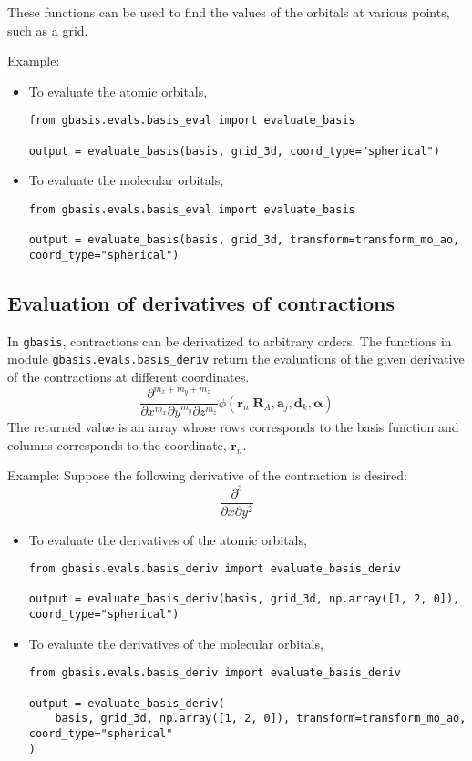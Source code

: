 \documentclass[letterpaper]{article}
\begin{document}
These functions can be used to find the values of the orbitals at various
points, such as a grid.

Example:
\begin{itemize}
\item To evaluate the atomic orbitals,
  \begin{lstlisting}[xleftmargin=-25pt]
from gbasis.evals.basis_eval import evaluate_basis

output = evaluate_basis(basis, grid_3d, coord_type="spherical")
\end{lstlisting}
\item To evaluate the molecular orbitals,
  \begin{lstlisting}[xleftmargin=-25pt]
from gbasis.evals.basis_eval import evaluate_basis

output = evaluate_basis(basis, grid_3d, transform=transform_mo_ao, coord_type="spherical")
\end{lstlisting}
\end{itemize}

\subsection{Evaluation of derivatives of contractions}
In \verb|gbasis|, contractions can be derivatized to arbitrary orders.
The functions in module \verb|gbasis.evals.basis_deriv| return the evaluations of the
given derivative of the contractions at different coordinates.
\begin{equation}
  \frac{\partial^{m_x + m_y + m_z}}{\partial x^{m_x} \partial y^{m_y} \partial z^{m_z}}
  \phi(\mathbf{r}_n | \mathbf{R}_{A}, \mathbf{a}_j, \mathbf{d}_k, \boldsymbol{\alpha})
\end{equation}
The returned value is an array whose rows corresponds to the basis function and
columns corresponds to the coordinate, $\mathbf{r}_n$.

Example:
Suppose the following derivative of the contraction is desired:
\begin{equation}
  \frac{\partial^3}{\partial x \partial y^2}
\end{equation}
\begin{itemize}
\item To evaluate the derivatives of the atomic orbitals,
  \begin{lstlisting}[xleftmargin=-25pt]
from gbasis.evals.basis_deriv import evaluate_basis_deriv

output = evaluate_basis_deriv(basis, grid_3d, np.array([1, 2, 0]), coord_type="spherical")
\end{lstlisting}
\item To evaluate the derivatives of the molecular orbitals,
  \begin{lstlisting}[xleftmargin=-25pt]
from gbasis.evals.basis_deriv import evaluate_basis_deriv

output = evaluate_basis_deriv(
    basis, grid_3d, np.array([1, 2, 0]), transform=transform_mo_ao, coord_type="spherical"
)
\end{lstlisting}
\end{itemize}
\end{document}
